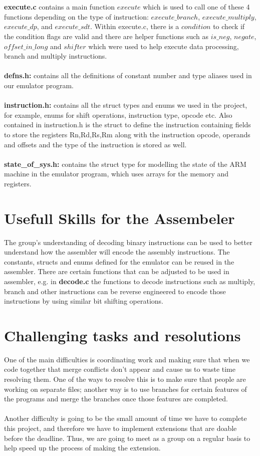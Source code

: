 \documentclass[a4paper]{article}
\begin{document}
\\\\
\textbf{execute.c} contains a main function $execute$ which is used to call one of these 4 functions depending on the type of instruction: $execute\_branch$, $execute\_multiply$, $execute\_dp$, and $execute\_sdt$. Within execute.c, there is a $condition$ to check if the condition flags are valid and there are helper functions such as $is\_neg$, $negate$, $offset\_in\_long$ and $shifter$ which were used to help execute data processing, branch and multiply instructions. 
\\\\
\textbf{defns.h:} contains all the definitions of constant number and type aliases used in our emulator program.
\\\\
\textbf{instruction.h:} contains all the struct types and enums we used in the project, for example, enums for shift operations, instruction type, opcode etc. Also contained in instruction.h is the struct to define the instruction containing fields to store the registers Rn,Rd,Rs,Rm along with the instruction opcode, operands and offsets and the type of the instruction is stored as well.  
\\\\
\textbf{state\_of\_sys.h:} contains the struct type for modelling the state of the ARM machine in the emulator program, which uses arrays for the memory and registers. 

\section{Usefull Skills for the Assembeler}
The group's understanding of decoding binary instructions can be used to better understand how the assembler will encode the assembly instructions. The constants, structs and enums defined for the emulator can be reused in the assembler. There are certain functions that can be adjusted to be used in assembler, e.g. in \textbf{decode.c} the functions to decode instructions such as multiply, branch and other instructions can be reverse engineered to encode those instructions by using similar bit shifting operations.

\section{Challenging tasks and resolutions}
One of the main difficulties is coordinating work and making sure that when we code together that merge conflicts don't appear and cause us to waste time resolving them. One of the ways to resolve this is to make sure that people are working on separate files; another way is to use branches for certain features of the programs and merge the branches once those features are completed. 
\\\\
Another difficulty is going to be the small amount of time we have to complete this project, and therefore we have to implement extensions that are doable before the deadline. Thus, we are going to meet as a group on a regular basis to help speed up the process of making the extension.
\end{document}
